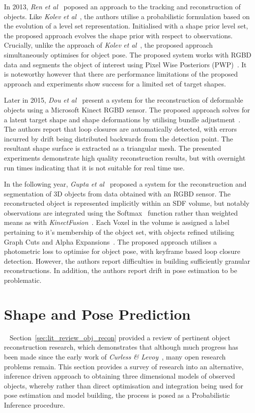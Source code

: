 In 2013, \textit{Ren et al}~\cite{Ren2013} poposed an approach to the tracking and reconstruction of 
objects. Like \textit{Kolev et al}~\cite{Kolev2006}, the authors utilise a probabilistic formulation 
based on the evolution of a level set representation. Initialised with a shape prior level set, the 
proposed approach evolves the shape prior with respect to observations. Crucially, unlike the approach of 
\textit{Kolev et al}~\cite{Kolev2006}, the proposed approach simultaneously optimises for object pose.
The proposed system works with RGBD data and segments the object of interest using Pixel Wise Posteriors 
(PWP)~\cite{Bibby2008}. It is noteworthy however that there are performance limitations of the proposed 
approach and experiments show success for a limited set of target shapes.

Later in 2015, \textit{Dou et al}~\cite{Dou2015} present a system for the reconstruction of deformable 
objects using a Microsoft Kinect RGBD sensor. The proposed approach solves for a latent target shape 
and shape deformations by utilising bundle adjustment~\cite{Triggs1999}. The authors report that loop 
closures are automatically detected, with errors incurred by drift being distributed backwards from the 
detection point. The resultant shape surface is extracted as a triangular mesh. The presented experiments 
demonstrate high quality reconstruction results, but with overnight run times indicating that it is not 
suitable for real time use.

In the following year, \textit{Gupta et al}~\cite{Gupta2016} proposed a system for the reconstruction and 
segmentation of 3D objects from data obtained with an RGBD sensor. The reconstructed object is represented 
implicitly within an SDF volume, but notably observations are integrated using the Softmax~\cite{Murphy2012ML} 
function rather than weighted means as with \textit{KinectFusion}~\cite{Newcombe2011}. Each Voxel in the 
volume is assigned a label pertaining to it's membership of the object set, with objects refined utilising 
Graph Cuts and Alpha Expansions~\cite{CLRS}. The proposed approach utilises a photometric loss to optimise 
for object pose, with keyframe based loop closure detection. However, the authors report difficulties in 
building sufficiently granular reconstructions. In addition, the authors report drift in pose estimation 
to be problematic.

\section{Shape and Pose Prediction}
~\label{sec:lit_review_prediction}
Section~\ref{sec:lit_review_obj_recon} provided a review of pertinent object reconstruction research, 
which demonstrates that although much progress has been made since the early work of \textit{Curless \& 
Levoy}~\cite{Curless1996}, many open research problems remain. This section provides a survey of research 
into an alternative, inference driven approach to obtaining three dimensional models of observed 
objects, whereby rather than direct optimisation and integration being used for pose estimation and 
model building, the process is posed as a Probabilistic Inference procedure.

